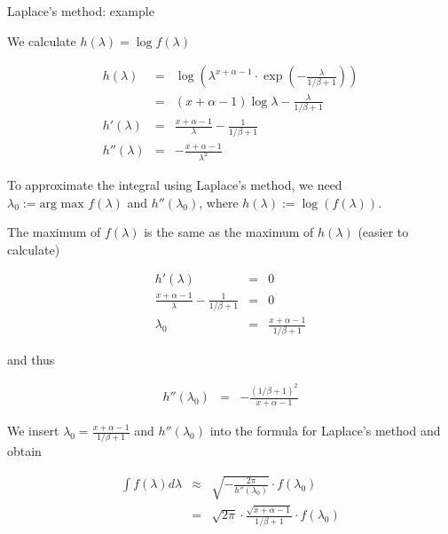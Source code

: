 \documentclass[11pt,compress,t,notes=noshow, xcolor=table]{beamer}
\begin{document}
\begin{vbframe}{Laplace's method: example}
\lz

We calculate $h(\lambda) = \log f(\lambda)$

\vspace*{-0.5cm}
\begin{eqnarray*}
h(\lambda) &=& \log \left(\lambda^{x + \alpha - 1}\cdot\exp(-\frac{\lambda}{1 / \beta + 1}) \right) \\
&=& \left({x} + \alpha - 1\right) \log \lambda - \frac{\lambda}{1 / \beta + 1} \\
h'(\lambda) &=& \frac{x + \alpha - 1}{\lambda} - \frac{1}{1 / \beta + 1} \\
h''(\lambda) &=& - \frac{x + \alpha - 1}{\lambda^2}
\end{eqnarray*}

\framebreak

To approximate the integral using Laplace's method, we need $\lambda_0 := \text{arg max } f(\lambda)$ and $h''(\lambda_0)$, where $h(\lambda) := \log (f(\lambda))$.

\lz

The maximum of $f(\lambda)$ is the same as the maximum of $h(\lambda)$ (easier to calculate)

\vspace*{-0.5cm}
\begin{eqnarray*}
h'(\lambda) &=& 0\\
\frac{x + \alpha - 1}{\lambda} - \frac{1}{1 / \beta + 1} &=& 0 \\
\lambda_0 &=& \frac{x + \alpha - 1}{1 / \beta + 1}
\end{eqnarray*}

and thus

\vspace*{-0.3cm}

\begin{eqnarray*}
h''(\lambda_0) &=& - \frac{(1 / \beta + 1)^2}{x + \alpha - 1}
\end{eqnarray*}

\framebreak

We insert $\lambda_0 = \frac{x + \alpha - 1}{1 / \beta + 1}$ and $h''(\lambda_0)$ into the formula for Laplace's method and obtain

\begin{eqnarray*}
\int f(\lambda) d\lambda &\approx& \sqrt{- \frac{2\pi}{h''(\lambda_0)}} \cdot f(\lambda_0) \\
&=& \sqrt{2 \pi} \cdot \frac{\sqrt{x + \alpha - 1}}{1 / \beta + 1}\cdot f(\lambda_0)
\end{eqnarray*}


\end{vbframe}
\end{document}
